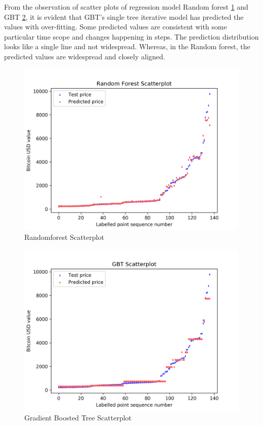 \documentclass[sigconf]{acmart}
\begin{document}
From the observation of scatter plots of regression model Random forest \ref{scpl:ran} and GBT \ref{scpl:gbt}, it is evident that GBT's single tree iterative model has predicted the values with over-fitting. Some predicted values are consistent with some particular time scope and changes happening in steps. The prediction distribution looks like a single line and not widespread. Whereas, in the Random forest, the predicted values are widespread and closely aligned.

\begin{figure}[!ht]
  \centering\includegraphics[width=\columnwidth]{images/RandomForestscatterplot.png}
  \caption{Randomforest Scatterplot}
  \label{scpl:ran}
\end{figure}

\begin{figure}[!ht]
  \centering\includegraphics[width=\columnwidth]{images/GBTscatterplot.png}
  \caption{Gradient Boosted Tree Scatterplot}
  \label{scpl:gbt}
\end{figure}
\end{document}
